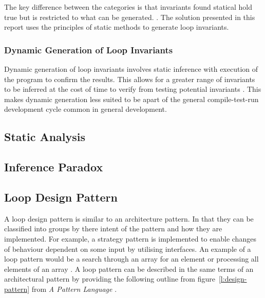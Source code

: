 The key difference between the categories is
that invariants found statical hold true
but is restricted to what can be generated.
\cite{benderfinding}\cite{Leino2005LoopIO}.
The solution presented in this report uses
the principles of static methods to generate loop invariants.

\subsubsection{Dynamic Generation of Loop Invariants}

Dynamic generation of loop invariants involves static inference
with execution of the program to confirm the results.
This allows for a greater range of invariants to be inferred
at the cost of time to verify from testing potential invariants
\cite{infer-dynamic} \cite{infer-postconditions}.
This makes dynamic generation less suited to be apart of
the general compile-test-run development cycle common in general development.

\subsection{Static Analysis}

\subsection{Inference Paradox}

\cite{infer-postconditions}

\subsection{Loop Design Pattern}

A loop design pattern is similar to an architecture pattern.
In that they can be classified into groups by there intent of
the pattern and how they are implemented.
For example, a strategy pattern is implemented to enable changes of
behaviour dependent on some input by utilising interfaces.
An example of a loop pattern would be a search through
an array for an element or processing all elements of an array
\cite{loop-patterns}.
A loop pattern can be described in the same terms of an architectural pattern
by providing the following outline from figure~\ref{l:design-pattern}
from \textit{A Pattern Language} \cite{pattern-lang}.

